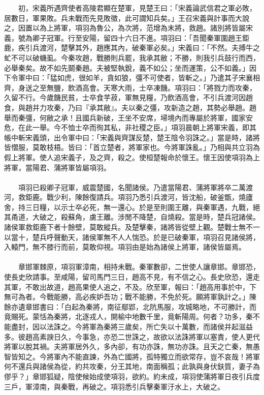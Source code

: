 　　初，宋義所遇齊使者高陵君顯在楚軍，見楚王曰：「宋義論武信君之軍必敗，居數日，軍果敗。兵未戰而先見敗徵，此可謂知兵矣。」王召宋義與計事而大說之，因置以為上將軍，項羽為魯公，為次將，范增為末將，救趙。諸別將皆屬宋義，號為卿子冠軍。行至安陽，留四十六日不進。項羽曰：「吾聞秦軍圍趙王鉅鹿，疾引兵渡河，楚擊其外，趙應其內，破秦軍必矣。」宋義曰：「不然。夫搏牛之虻不可以破蟣虱。今秦攻趙，戰勝則兵罷，我承其敝；不勝，則我引兵鼓行而西，必舉秦矣。故不如先鬬秦趙。夫被堅執銳，義不如公；坐而運策，公不如義。」因下令軍中曰：「猛如虎，很如羊，貪如狼，彊不可使者，皆斬之。」乃遣其子宋襄相齊，身送之至無鹽，飲酒高會。天寒大雨，士卒凍饑。項羽曰：「將戮力而攻秦，久留不行。今歲饑民貧，士卒食芋菽，軍無見糧，乃飲酒高會，不引兵渡河因趙食，與趙并力攻秦，乃曰『承其敝』。夫以秦之彊，攻新造之趙，其勢必舉趙。趙舉而秦彊，何敝之承！且國兵新破，王坐不安席，埽境內而專屬於將軍，國家安危，在此一舉。今不恤士卒而徇其私，非社稷之臣。」項羽晨朝上將軍宋義，即其帳中斬宋義頭，出令軍中曰：「宋義與齊謀反楚，楚王陰令羽誅之。」當是時，諸將皆慴服，莫敢枝梧。皆曰：「首立楚者，將軍家也。今將軍誅亂。」乃相與共立羽為假上將軍。使人追宋義子，及之齊，殺之。使桓楚報命於懷王。懷王因使項羽為上將軍，當陽君、蒲將軍皆屬項羽。
\\\\
　　項羽已殺卿子冠軍，威震楚國，名聞諸侯。乃遣當陽君、蒲將軍將卒二萬渡河，救鉅鹿。戰少利，陳餘復請兵。項羽乃悉引兵渡河，皆沈船，破釜甑，燒廬舍，持三日糧，以示士卒必死，無一還心。於是至則圍王離，與秦軍遇，九戰，絕其甬道，大破之，殺蘇角，虜王離。涉閒不降楚，自燒殺。當是時，楚兵冠諸侯。諸侯軍救鉅鹿下者十餘壁，莫敢縱兵。及楚擊秦，諸將皆從壁上觀。楚戰士無不一以當十，楚兵呼聲動天，諸侯軍無不人人惴恐。於是已破秦軍，項羽召見諸侯將，入轅門，無不膝行而前，莫敢仰視。項羽由是始為諸侯上將軍，諸侯皆屬焉。
\\\\
　　章邯軍棘原，項羽軍漳南，相持未戰。秦軍數卻，二世使人讓章邯。章邯恐，使長史欣請事。至咸陽，留司馬門三日，趙高不見，有不信之心。長史欣恐，還走其軍，不敢出故道，趙高果使人追之，不及。欣至軍，報曰：「趙高用事於中，下無可為者。今戰能勝，高必疾妒吾功；戰不能勝，不免於死。願將軍孰計之。」陳餘亦遺章邯書曰：「白起為秦將，南征鄢郢，北阬馬服，攻城略地，不可勝計，而竟賜死。蒙恬為秦將，北逐戎人，開榆中地數千里，竟斬陽周。何者？功多，秦不能盡封，因以法誅之。今將軍為秦將三歲矣，所亡失以十萬數，而諸侯并起滋益多。彼趙高素諛日久，今事急，亦恐二世誅之，故欲以法誅將軍以塞責，使人更代將軍以脫其禍。夫將軍居外久，多內卻，有功亦誅，無功亦誅。且天之亡秦，無愚智皆知之。今將軍內不能直諫，外為亡國將，孤特獨立而欲常存，豈不哀哉！將軍何不還兵與諸侯為從，約共攻秦，分王其地，南面稱孤；此孰與身伏鈇質，妻子為僇乎？」章邯狐疑，陰使候始成使項羽，欲約。約未成，項羽使蒲將軍日夜引兵度三戶，軍漳南，與秦戰，再破之。項羽悉引兵擊秦軍汙水上，大破之。
